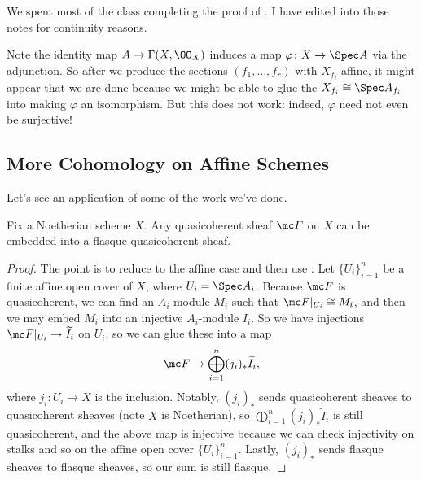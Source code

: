 \documentclass[../notes.tex]{subfiles}
\begin{document}
We spent most of the class completing the proof of . I have edited into those notes for continuity reasons.
\begin{remark}
	Note the identity map $A\to\Gamma(X,\OO_X)$ induces a map $\varphi\colon X\to\Spec A$ via the adjunction. So after we produce the sections $(f_1,\ldots,f_r)$ with $X_{f_i}$ affine, it might appear that we are done because we might be able to glue the $X_{f_i}\cong\Spec A_{f_i}$ into making $\varphi$ an isomorphism. But this does not work: indeed, $\varphi$ need not even be surjective!
\end{remark}

\subsection{More Cohomology on Affine Schemes}
Let's see an application of some of the work we've done.
\begin{corollary}
	Fix a Noetherian scheme $X$. Any quasicoherent sheaf $\mc F$ on $X$ can be embedded into a flasque quasicoherent sheaf.
\end{corollary}
\begin{proof}
	The point is to reduce to the affine case and then use . Let $\{U_i\}_{i=1}^n$ be a finite affine open cover of $X$, where $U_i=\Spec A_i$. Because $\mc F$ is quasicoherent, we can find an $A_i$-module $M_i$ such that $\mc F|_{U_i}\cong M_i$, and then we may embed $M_i$ into an injective $A_i$-module $I_i$. So we have injections $\mc F|_{U_i}\to\widetilde I_i$ on $U_i$, so we can glue these into a map
	\[\mc F\to\bigoplus_{i=1}^n(j_i)_*\widetilde I_i,\]
	where $j_i\colon U_i\to X$ is the inclusion. Notably, $(j_i)_*$ sends quasicoherent sheaves to quasicoherent sheaves (note $X$ is Noetherian), so $\bigoplus_{i=1}^n(j_i)_*\widetilde I_i$ is still quasicoherent, and the above map is injective because we can check injectivity on stalks and so on the affine open cover $\{U_i\}_{i=1}^n$. Lastly, $(j_i)_*$ sends flasque sheaves to flasque sheaves, so our sum is still flasque.
\end{proof}
\end{document}
